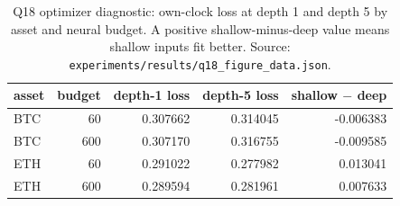 \begin{table}[h]\centering
\caption{Q18 optimizer diagnostic: own-clock loss at depth 1 and depth 5 by asset and neural
budget. A positive shallow-minus-deep value means shallow inputs fit better. Source:
\texttt{experiments/results/q18\_figure\_data.json}.}
\label{tab:q18opt}
\begin{tabular}{lrrrr}
\toprule
asset & budget & depth-1 loss & depth-5 loss & shallow $-$ deep \\
\midrule
BTC & 60 & 0.307662 & 0.314045 & -0.006383 \\
BTC & 600 & 0.307170 & 0.316755 & -0.009585 \\
ETH & 60 & 0.291022 & 0.277982 & 0.013041 \\
ETH & 600 & 0.289594 & 0.281961 & 0.007633 \\
\bottomrule
\end{tabular}\end{table}
